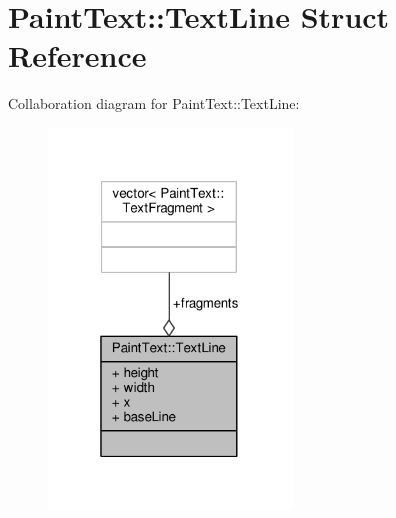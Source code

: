 \hypertarget{structPaintText_1_1TextLine}{}\section{Paint\+Text\+:\+:Text\+Line Struct Reference}
\label{structPaintText_1_1TextLine}


Collaboration diagram for Paint\+Text\+:\+:Text\+Line\+:
\nopagebreak
\begin{figure}[H]
\begin{center}
\leavevmode
\includegraphics[width=184pt]{d0/d95/structPaintText_1_1TextLine__coll__graph}
\end{center}
\end{figure}
